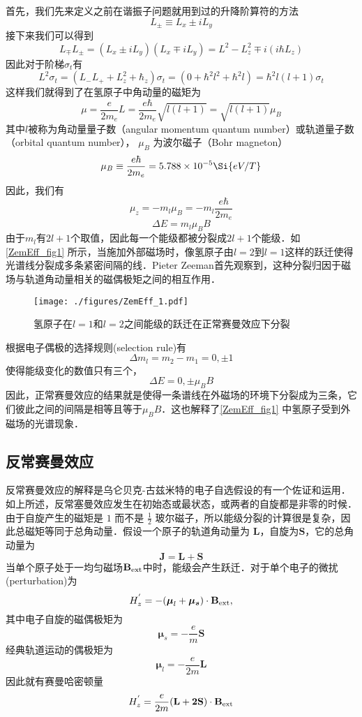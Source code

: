 首先，我们先来定义之前在谐振子问题就用到过的升降阶算符的方法
\begin{equation}
L_{\pm}\equiv L_x \pm iL_y
\end{equation}
接下来我们可以得到
\begin{equation}
L_{\mp}L_{\pm}=(L_x \pm i L_y)(L_x \mp i L_y)=L^2-L_z^2\mp i(i\hbar L_z)
\end{equation}
因此对于阶梯$\sigma_t$有
\begin{equation}
L^2\sigma_t=(L_{-}L_{+}+L^2_z+\hbar_z)\sigma_t=(0+\hbar^2l^2+\hbar^2l)=\hbar^2l(l+1)\sigma_t
\end{equation}
这样我们就得到了在氢原子中角动量的磁矩为
$$\mu=\frac{e}{2m_e}L=\frac{e\hbar}{2m_e}\sqrt{l(l+1)}=\sqrt{l(l+1)}\mu_B$$
其中$l$被称为角动量量子数（angular momentum quantum number）或轨道量子数（orbital quantum number）， $\mu_B$ 为波尔磁子（Bohr magneton）
\begin{equation}
\mu_B\equiv\frac{e\hbar}{2m_e}=5.788\times 10^{-5}\Si{eV/T}
\end{equation}
因此，我们有$$\mu_z=-m_l\mu_B=-m_l\frac{e\hbar}{2m_e}$$
\begin{equation}
\Delta E = m_l\mu_B B
\end{equation}
由于$m_l$有$2l+1$个取值，因此每一个能级都被分裂成$2l+1$个能级．如\autoref{ZemEff_fig1} 所示，当施加外部磁场时，像氢原子由$l=2$到$l=1$这样的跃迁使得光谱线分裂成多条紧密间隔的线．Pieter Zeeman首先观察到，这种分裂归因于磁场与轨道角动量相关的磁偶极矩之间的相互作用．
\begin{figure}[ht]
\centering
\texttt{[image: ./figures/ZemEff\_1.pdf]}
\caption{氢原子在$l=1$和$l=2$之间能级的跃迁在正常赛曼效应下分裂} \label{ZemEff_fig1}
\end{figure}
根据电子偶极的选择规则(selection rule)有
$$
\Delta m_l = m_2-m_1=0,\pm 1
$$
使得能级变化的数值只有三个，
$$
\Delta E = 0,\pm \mu_B B
$$
因此，正常赛曼效应的结果就是使得一条谱线在外磁场的环境下分裂成为三条，它们彼此之间的间隔是相等且等于$\mu_B B$．这也解释了\autoref{ZemEff_fig1} 中氢原子受到外磁场的光谱现象．
\subsection{反常赛曼效应}
反常赛曼效应的解释是乌仑贝克-古兹米特的电子自选假设的有一个佐证和运用．如上所述，反常塞曼效应发生在初始态或最状态，或两者的自旋都是非零的时候．由于自旋产生的磁矩是 $1$ 而不是 $\frac{1}{2}$ 玻尔磁子，所以能级分裂的计算很是复杂，因此总磁矩等同于总角动量．假设一个原子的轨道角动量为 $\mathbf{L}$，自旋为$\mathbf{S}$，它的总角动量为
$$\mathbf{J=L+S}$$
当单个原子处于一均匀磁场$\mathbf{B}_{\rm{ext}}$中时，能级会产生跃迁．对于单个电子的微扰(perturbation)为
$$H_z^{'} = -(\boldsymbol{\mu}_l+\boldsymbol{\mu_s})\cdot \mathbf{B}_{\rm{ext}},$$
其中电子自旋的磁偶极矩为$$\boldsymbol\mu _s =-\frac{e}{m}\mathbf{S}$$经典轨道运动的偶极矩为
$$\boldsymbol\mu _l =-\frac{e}{2m}\mathbf{L}$$
因此就有赛曼哈密顿量
\begin{equation}\label{ZemEff_eq5}
H_z^{'} = \frac{e}{2m}(\mathbf{L+2S})\cdot \mathbf{B}_{\rm{ext}}
\end{equation}

